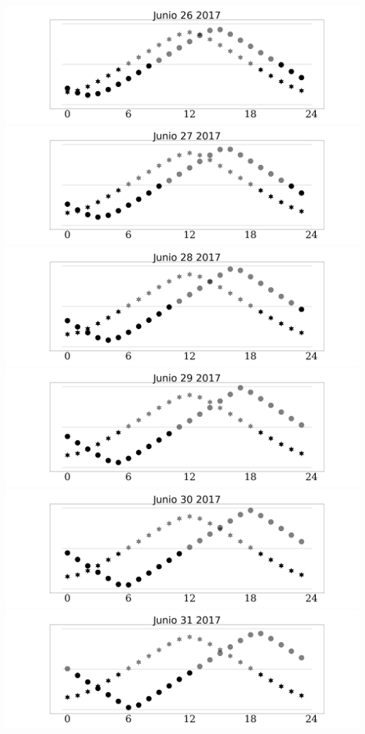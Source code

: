 \documentclass{report}
\begin{document}
\includegraphics[width=1.00\textwidth]{Junio_26_2017.png}\newpage
\includegraphics[width=1.00\textwidth]{Junio_27_2017.png}\newpage
\includegraphics[width=1.00\textwidth]{Junio_28_2017.png}\newpage
\includegraphics[width=1.00\textwidth]{Junio_29_2017.png}\newpage
\includegraphics[width=1.00\textwidth]{Junio_30_2017.png}\newpage
\includegraphics[width=1.00\textwidth]{Junio_31_2017.png}\newpage
\end{document}
